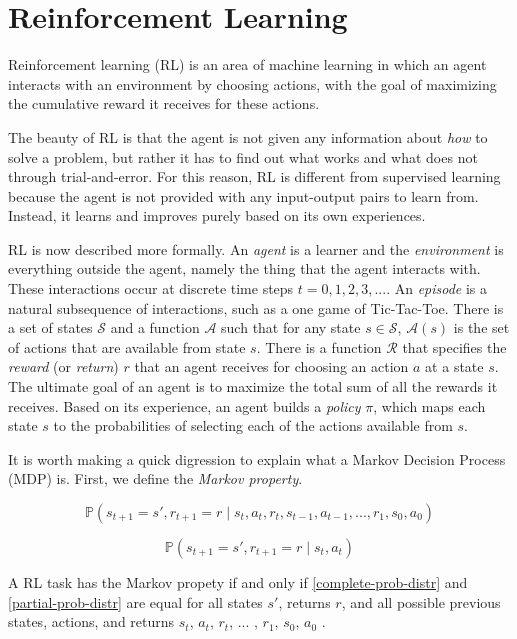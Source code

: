 \documentclass[11pt,a4paper]{report}
\begin{document}
\section{Reinforcement Learning}
\label{sec:RL}

Reinforcement learning (RL) is an area of machine learning in which an agent interacts with an environment by choosing actions, with the goal of maximizing the cumulative reward it receives for these actions.

The beauty of RL is that the agent is not given any information about \emph{how} to solve a problem, but rather it has to find out what works and what does not through trial-and-error. For this reason, RL is different from supervised learning because the agent is not provided with any input-output pairs to learn from. Instead, it learns and improves purely based on its own experiences.

RL is now described more formally. An \emph{agent} is a learner and the \emph{environment} is everything outside the agent, namely the thing that the agent interacts with. These interactions occur at discrete time steps $t = 0, 1, 2, 3, ...$. An \emph{episode} is a natural subsequence of interactions, such as a one game of Tic-Tac-Toe. There is a set of states $\mathcal{S}$ and a function $\mathcal{A}$ such that for any state $s \in \mathcal{S}$, $\mathcal{A}(s)$ is the set of actions that are available from state $s$. There is a function $\mathcal{R}$ that specifies the \emph{reward} (or \emph{return}) $r$ that an agent receives for choosing an action $a$ at a state $s$. The ultimate goal of an agent is to maximize the total sum of all the rewards it receives. Based on its experience, an agent builds a \emph{policy} $\pi$, which maps each state $s$ to the probabilities of selecting each of the actions available from $s$.

It is worth making a quick digression to explain what a Markov Decision Process (MDP) is. First, we define the \emph{Markov property}.

\begin{equation}
	\mathbb{P}(s_{t+1} = s', r_{t+1} = r \mid s_t, a_t, r_t, s_{t-1}, a_{t-1}, ... , r_1, s_0, a_0)
 \label{complete-prob-distr}
\end{equation}

\begin{equation}
	\mathbb{P}(s_{t+1} = s', r_{t+1} = r \mid s_t, a_t) \label{partial-prob-distr}
\end{equation}

A RL task has the Markov propety if and only if \ref{complete-prob-distr} and \ref{partial-prob-distr} are equal for all states $s'$, returns $r$, and all possible previous states, actions, and returns $s_t$, $a_t$, $r_t$, ... , $r_1$, $s_0$, $a_0$ \cite{rl-book}.
\end{document}
